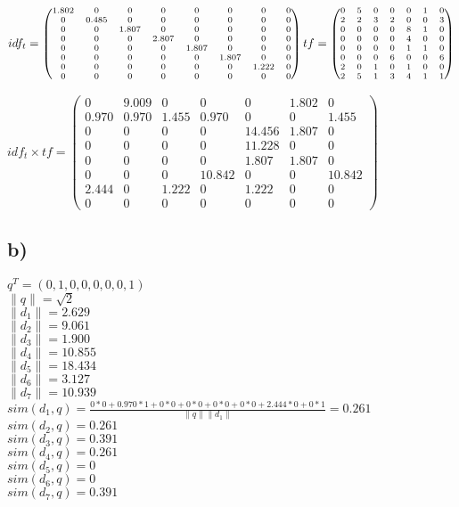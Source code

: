 \documentclass[11pt,a4paper,parskip=half ]{scrartcl}
\begin{document}
$\scriptsize
idf_t = 
\left(\begin{matrix}
	1.802 & 0 & 0 & 0 & 0 & 0 & 0 & 0 \\
	0 & 0.485 & 0 & 0 & 0 & 0 & 0 & 0 \\
	0 & 0 & 1.807 & 0 & 0 & 0 & 0 & 0 \\
	0 & 0 & 0 & 2.807 & 0 & 0 & 0 & 0 \\
	0 & 0 & 0 & 0 & 1.807 & 0 & 0 & 0 \\
	0 & 0 & 0 & 0 & 0 & 1.807 & 0 & 0 \\
	0 & 0 & 0 & 0 & 0 & 0 & 1.222 & 0 \\
	0 & 0 & 0 & 0 & 0 & 0 & 0 & 0
\end{matrix}\right)
tf = 
\left(\begin{matrix}
	0 & 5 & 0 & 0 & 0 & 1 & 0 \\
	2 & 2 & 3 & 2 & 0 & 0 & 3 \\
	0 & 0 & 0 & 0 & 8 & 1 & 0 \\
	0 & 0 & 0 & 0 & 4 & 0 & 0 \\
	0 & 0 & 0 & 0 & 1 & 1 & 0 \\
	0 & 0 & 0 & 6 & 0 & 0 & 6 \\
	2 & 0 & 1 & 0 & 1 & 0 & 0 \\
	2 & 5 & 1 & 3 & 4 & 1 & 1
\end{matrix}\right)$\\
\begin{center}$
	idf_t\times tf=	
	\left(\begin{matrix}
		0 & 9.009 & 0 & 0 & 0 & 1.802 & 0 \\
		0.970 & 0.970 & 1.455 & 0.970 & 0 & 0 & 1.455 \\
		0 & 0 & 0 & 0 & 14.456 & 1.807 & 0 \\
		0 & 0 & 0 & 0 & 11.228 & 0 & 0 \\
		0 & 0 & 0 & 0 & 1.807 & 1.807 & 0 \\
		0 & 0 & 0 & 10.842 & 0 & 0 & 10.842 \\
		2.444 & 0 & 1.222 & 0 & 1.222 & 0 & 0 \\
		0 & 0 & 0 & 0 & 0 & 0 & 0
	\end{matrix}\right)
$\end{center}

\subsection*{b)}
$q^T=(0,1,0,0,0,0,0,1)$	\\
$\|q\|=\sqrt{2}$\\
$\|d_1\|=2.629$\\
$\|d_2\|=9.061$\\
$\|d_3\|=1.900$\\
$\|d_4\|=10.855$\\
$\|d_5\|=18.434$\\
$\|d_6\|=3.127$\\
$\|d_7\|=10.939$\\

$sim(d_1,q)=\frac{0*0+0.970*1+0*0+0*0+0*0+0*0+2.444*0+0*1}{\|q\|\|d_1\|}=0.261$\\
$sim(d_2,q)=0.261$\\
$sim(d_3,q)=0.391$\\
$sim(d_4,q)=0.261$\\
$sim(d_5,q)=0$\\
$sim(d_6,q)=0$\\
$sim(d_7,q)=0.391$\\

	
\end{document}
